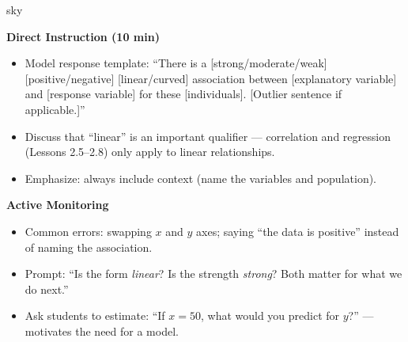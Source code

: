 \documentclass[10pt]{article}
\begin{document}
\begin{skillbox}{sky}
\begin{minipage}[t]{0.48\linewidth}
    \textbf{Direct Instruction (10 min)}
    \begin{itemize}
        \item Model response template: ``There is a [strong/moderate/weak] [positive/negative] [linear/curved] association between [explanatory variable] and [response variable] for these [individuals]. [Outlier sentence if applicable.]''
        \item Discuss that ``linear'' is an important qualifier --- correlation and regression (Lessons 2.5--2.8) only apply to linear relationships.
        \item Emphasize: always include context (name the variables and population).
    \end{itemize}
\end{minipage}
\hfill
\begin{minipage}[t]{0.48\linewidth}
    \textbf{Active Monitoring}
    \begin{itemize}
        \item Common errors: swapping $x$ and $y$ axes; saying ``the data is positive'' instead of naming the association.
        \item Prompt: ``Is the form \textit{linear}? Is the strength \textit{strong}? Both matter for what we do next.''
        \item Ask students to estimate: ``If $x = 50$, what would you predict for $y$?'' --- motivates the need for a model.
    \end{itemize}
\end{minipage}
\end{skillbox}
\end{document}

